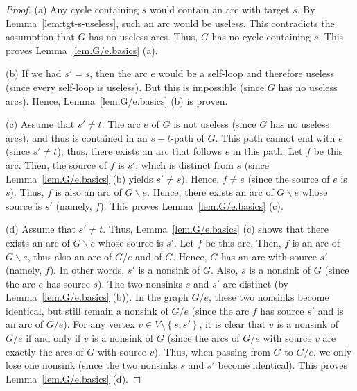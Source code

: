 \documentclass[12pt]{amsart}
\theoremstyle{definition}
\newcommand{\set}[1]{\left\{ #1 \right\}}
\begin{document}
\begin{proof}

(a) Any cycle containing $s$ would contain an arc with target $s$.  By Lemma~\ref{lem:tgt-s-useless}, such an arc would be useless.
This contradicts the assumption that $G$ has no useless arcs.  Thus, $G$ has no cycle containing $s$.  This proves Lemma~\ref{lem.G/e.basics} (a).

(b) If we had $s' = s$, then the arc $e$ would be a self-loop and therefore useless (since every self-loop is useless). But this is impossible (since $G$ has no useless arcs).
Hence, Lemma~\ref{lem.G/e.basics} (b) is proven.  


(c) Assume that $s' \neq t$.
The arc $e$ of $G$ is not useless (since $G$ has no useless arcs),
and thus is contained in an $s-t$-path of $G$.
This path cannot end with $e$ (since $s' \neq t$);
thus, there exists an arc that follows $e$ in this path.
Let $f$ be this arc.
Then, the source of $f$ is $s'$,
which is distinct from $s$ (since Lemma~\ref{lem.G/e.basics} (b)
yields $s' \neq s$).
Hence, $f \neq e$ (since the source of $e$ is $s$).
Thus, $f$ is also an arc of $G \backslash e$.
Hence, there exists an arc
of $G \backslash e$ whose source is $s'$ (namely, $f$).
This proves Lemma~\ref{lem.G/e.basics} (c).

(d) Assume that $s' \neq t$.
Thus, Lemma~\ref{lem.G/e.basics} (c) shows that
there exists an arc of $G \backslash e$ whose source is $s'$.
Let $f$ be this arc.
Then, $f$ is an arc of $G \backslash e$, thus also an
arc of $G / e$ and of $G$.
Hence, $G$ has an arc with source $s'$ (namely, $f$).
In other words, $s'$ is a nonsink of $G$.
Also, $s$ is a nonsink of $G$ (since the arc $e$ has source $s$).
The two nonsinks $s$ and $s'$ are distinct (by
Lemma~\ref{lem.G/e.basics} (b)).
In the graph $G / e$, these two nonsinks become identical, but still
remain a nonsink of $G / e$ (since the arc $f$ has source $s'$ and
is an arc of $G / e$).
For any vertex $v \in V \setminus \set{s,s'}$, it is clear that
$v$ is a nonsink of $G / e$ if and only if $v$ is a nonsink of $G$
(since the arcs of $G / e$ with source $v$ are exactly the arcs of $G$
with source $v$).
Thus, when passing from $G$ to $G / e$, we only lose one nonsink (since the
two nonsinks $s$ and $s'$ become identical).
This proves Lemma~\ref{lem.G/e.basics} (d).


\end{proof}
\end{document}
